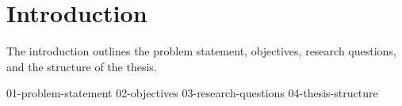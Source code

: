 \section{Introduction}

The introduction outlines the problem statement, objectives, research questions,
and the structure of the thesis.

{01-problem-statement}
{02-objectives}
{03-research-questions}
{04-thesis-structure}
